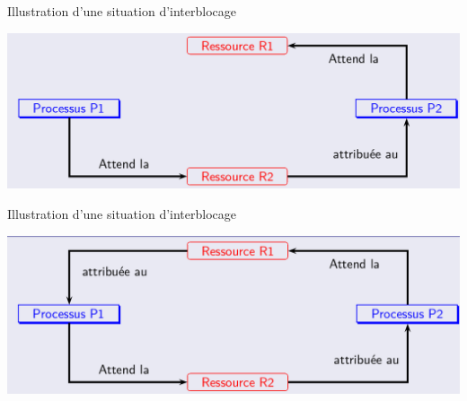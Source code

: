 \documentclass[10pt]{beamer}
\begin{document}
\begin{frame}
	\mframe{\Processus}
	\setlength{\shadowsize}{1pt}
	\begin{block}{Illustration d'une situation d'interblocage}
		\begin{center}	
			\includegraphics[scale=0.25]{../../Archi_Materielle/data/blocage_4}
		\end{center}
	\end{block}
\end{frame}

\begin{frame}
	\mframe{\Processus}
	\setlength{\shadowsize}{1pt}
	\begin{block}{Illustration d'une situation d'interblocage}
		\begin{center}	
			\includegraphics[scale=0.25]{../../Archi_Materielle/data/blocage_5}
		\end{center}
	\end{block}
\end{frame}
\end{document}
